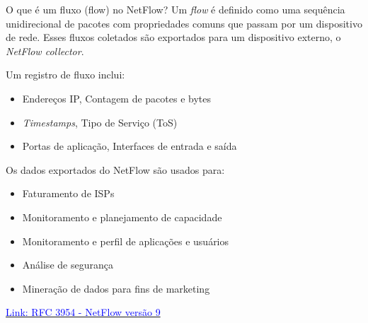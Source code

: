 \begin{frame}{O que é um fluxo (flow) no NetFlow?}
    Um \textit{flow} é definido como uma sequência unidirecional de pacotes com propriedades comuns que passam por um dispositivo de rede. Esses fluxos coletados são exportados para um dispositivo externo, o \textit{NetFlow collector}.

    \vspace{0.3cm}
    Um registro de fluxo inclui:
    \begin{itemize}
        \item Endereços IP, Contagem de pacotes e bytes
        \item \textit{Timestamps}, Tipo de Serviço (ToS)
        \item Portas de aplicação, Interfaces de entrada e saída
    \end{itemize}

    \vspace{0.3cm}
    Os dados exportados do NetFlow são usados para:
    \begin{itemize}
        \item Faturamento de ISPs
        \item Monitoramento e planejamento de capacidade
        \item Monitoramento e perfil de aplicações e usuários
        \item Análise de segurança
        \item Mineração de dados para fins de marketing
    \end{itemize}

    \href{https://datatracker.ietf.org/doc/html/rfc3954}{\textcolor{blue}{Link: RFC 3954 -  NetFlow versão 9}}

\end{frame}


